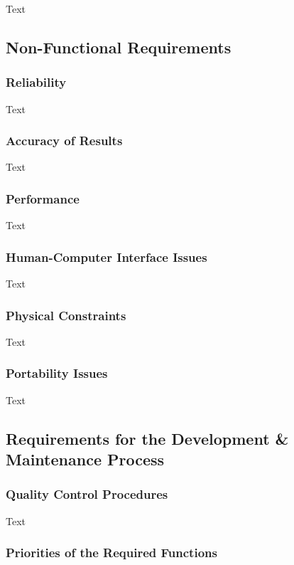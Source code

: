 \documentclass[12pt]{article}
\begin{document}
Text

\subsection{Non-Functional Requirements}

\subsubsection {Reliability}

Text

\subsubsection {Accuracy of Results}
 
Text

\subsubsection {Performance}

Text

\subsubsection {Human-Computer Interface Issues}

Text

\subsubsection {Physical Constraints}

Text

\subsubsection {Portability Issues}

Text

\subsection{Requirements for the Development & Maintenance Process}

\subsubsection {Quality Control Procedures}

Text

\subsubsection {Priorities of the Required Functions}
\end{document}
